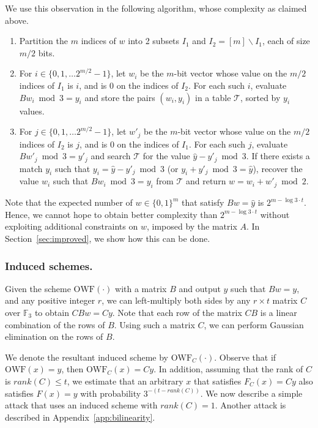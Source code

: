 \documentclass[orivec,envcountsect]{llncs}
\newcommand{\OWF}{\text{OWF}}
\begin{document}
We use this observation in the following algorithm, whose complexity as claimed above.
\begin{enumerate}
  \item Partition the $m$ indices of $w$ into 2 subsets $I_1$ and $I_2 = [m] \backslash I_1$, each of size $m/2$ bits.
  \item For $i \in \{0,1,\ldots 2^{m/2} - 1\}$, let $w_i$ be the $m$-bit vector whose value on the $m/2$ indices of $I_1$ is $i$, and is 0 on the indices of $I_2$. For each such $i$,
      evaluate $B w_i \bmod 3 = y_i$ and store the pairs $(w_i,y_i)$ in a table $\mathcal{T}$, sorted by $y_i$ values.
  \item For $j \in \{0,1,\ldots 2^{m/2} - 1\}$, let $w'_j$ be the $m$-bit vector whose value on the $m/2$ indices of $I_2$ is $j$, and is 0 on the indices of $I_1$. For each such $j$,
      evaluate $B w'_j \bmod 3 = y'_j$ and search $\mathcal{T}$ for the value $\hat{y} - y'_j \bmod 3$. If there exists a match $y_i$ such that $y_i = \hat{y} - y'_j \bmod 3$ (or $y_i + y'_j \bmod 3 = \hat{y}$), recover the value $w_i$ such that $B w_i \bmod 3 = y_i$ from $\mathcal{T}$
      and return $w = w_i + w'_j \bmod 2$.
\end{enumerate}

Note that the expected number of $w \in \{0,1\}^m$ that satisfy $B w = \hat{y}$ is $2^{m - \log 3 \cdot t}$. Hence, we cannot hope to obtain better complexity than $2^{m - \log 3 \cdot t}$ without exploiting additional constraints on $w$, imposed by the matrix $A$. In Section~\ref{sec:improved}, we show how this can be done.

\subsubsection{Induced schemes.}
Given the scheme $\OWF(\cdot)$ with a matrix $B$ and output $y$ such that $Bw = y$, and any positive integer $r$, we can left-multiply both sides by any $r \times t$ matrix $C$ over $\mathbb{F}_3$ to obtain $CBw = Cy$. Note that each row of the matrix $CB$ is a linear combination of the rows of $B$. Using such a matrix $C$, we can perform Gaussian elimination on the rows of $B$.

We denote the resultant induced scheme by $\OWF_C(\cdot)$. Observe that if $\OWF(x) = y$, then $\OWF_C(x) = Cy$.
In addition, assuming that the rank of $C$ is $rank(C) \leq t$, we estimate that an arbitrary $x$ that satisfies $F_C(x) = Cy$ also satisfies $F(x) = y$ with probability $3^{-(t - rank(C))}$.
We now describe a simple attack that uses an induced scheme with $rank(C)=1$. Another attack is described in Appendix~\ref{app:bilinearity}.
\end{document}
